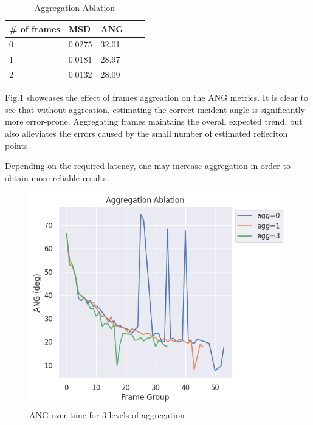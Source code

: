 \documentclass[../main.tex]{subfiles}
\begin{document}
\begin{table}[htbp]
    \caption{Aggregation Ablation}
    \begin{center}
    \begin{tabular}{lllll}
    \hline
    \textbf{\# of frames} & \textbf{MSD}                         & \textbf{ANG}                        &  &  \\ \hline
    \multicolumn{1}{l}{0} & \multicolumn{1}{l}{0.0275} & \multicolumn{1}{l}{32.01} &  &  \\ \cline{1-3}
    \multicolumn{1}{l}{1} & \multicolumn{1}{l}{0.0181} & \multicolumn{1}{l}{28.97} &  &  \\ \cline{1-3}
    2                       & 0.0132                      & 28.09                      &  &  \\ \hline
    \end{tabular}
    \end{center}
\end{table}

Fig.\ref*{fig:ablation} showcases the effect of frames aggreation on the ANG metrics. It is clear to see that without aggreation, estimating the correct incident angle is significantly more error-prone. Aggregating frames maintains the overall expected trend, but also alleviates the errors caused by the small number of estimated refleciton points.

\par
Depending on the required latency, one may increase aggregation in order to obtain more reliable results.

\begin{figure}[htbp]
    \centerline{\includegraphics[scale=0.33]{figures/fig_ablation.png}}
    \caption{ANG over time for 3 levels of aggregation}
    \label{fig:ablation}
\end{figure}
\end{document}
